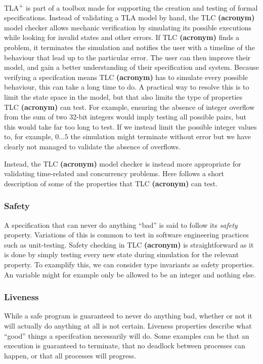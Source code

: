 \documentclass[english, biblatex, digitaloutput]{kththesis}
\begin{document}
TLA\textsuperscript+ is part of a toolbox made for supporting the creation and testing of formal specifications. Instead of validating a TLA model by hand, the TLC \textbf{(acronym)} model checker allows mechanic verification by simulating its possible executions while looking for invalid states and other errors. If TLC \textbf{(acronym)} finds a problem, it terminates the simulation and notifies the user with a timeline of the behaviour that lead up to the particular error. The user can then improve their model, and gain a better understanding of their specification and system. Because verifying a specifcation means TLC \textbf{(acronym)} has to simulate every possible behaviour, this can take a long time to do. A practical way to resolve this is to limit the state space in the model, but that also limits the type of properties TLC \textbf{(acronym)} can test. For example, ensuring the absence of integer overflow from the sum of two 32-bit integers would imply testing all possible pairs, but this would take far too long to test. If we instead limit the possible integer values to, for example, $0 \dotsc 5$ the simulation might terminate without error but we have clearly not managed to validate the absence of overflows.

Instead, the TLC \textbf{(acronym)} model checker is instead more appropriate for validating time-related and concurrency problems. Here follows a short description of some of the properties that TLC \textbf{(acronym)} can test.

\subsubsection{Safety}

A specification that can never do anything ``bad'' is said to follow its \textit{safety} property. Variations of this is common to test in software engineering practices such as unit-testing. Safety checking in TLC \textbf{(acronym)} is straightforward as it is done by simply testing every new state during simulation for the relevant property. To examplify this, we can consider type invariants as safety properties. An variable might for example only be allowed to be an integer and nothing else.

\subsubsection{Liveness}

While a safe program is guaranteed to never do anything bad, whether or not it will actually do anything at all is not certain. Liveness properties describe what ``good'' things a specifcation necessarily will do. Some examples can be that an execution is guaranteed to terminate, that no deadlock between processes can happen, or that all processes will progress.
\end{document}
